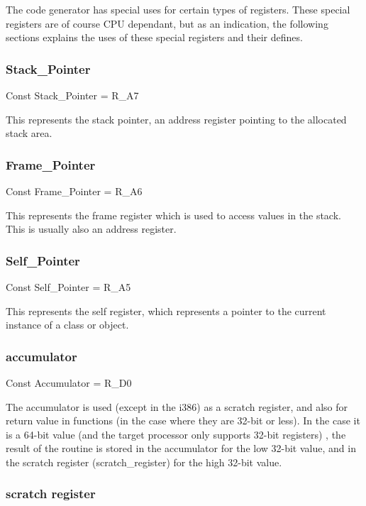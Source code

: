 \documentclass [a4paper,12pt]{article}
\begin{document}
The code generator has special uses for certain types of registers. These
special registers are of course CPU dependant, but as an indication, the
following sections explains the uses of these special registers and their
defines.

\subsubsection{Stack{\_}Pointer}
\label{subsubsec:stack}

\textsf{Const Stack{\_}Pointer = R{\_}A7}

This represents the stack pointer, an address register pointing to the
allocated stack area.

\subsubsection{Frame{\_}Pointer}
\label{subsubsec:frame}

\textsf{Const Frame{\_}Pointer = R{\_}A6}

This represents the frame register which is used to access values in the
stack. This is usually also an address register.

\subsubsection{Self{\_}Pointer}
\label{subsubsec:mylabel26}

\textsf{Const Self{\_}Pointer = R{\_}A5}

This represents the self register, which represents a pointer to the current
instance of a class or object.

\subsubsection{accumulator}
\label{subsubsec:accumulatorents}

\textsf{Const Accumulator = R{\_}D0}

The accumulator is used (except in the i386) as a scratch register, and also
for return value in functions (in the case where they are 32-bit or less).
In the case it is a 64-bit value (and the target processor only supports
32-bit registers) , the result of the routine is stored in the accumulator
for the low 32-bit value, and in the scratch register
(\textsf{scratch{\_}register}) for the high 32-bit value.

\subsubsection{scratch register}
\label{subsubsec:mylabel27}
\end{document}
